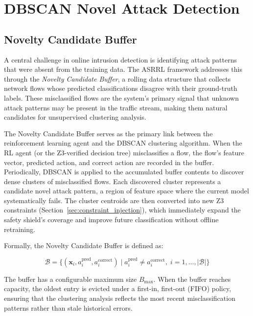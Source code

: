 \documentclass[12pt, letterpaper, oneside]{report}
\newcommand{\ASRRL}{\textsc{ASRRL}}
\newcommand{\bx}{\mathbf{x}}
\begin{document}
\section{DBSCAN Novel Attack Detection}
\label{sec:dbscan}

\subsection{Novelty Candidate Buffer}

A central challenge in online intrusion detection is identifying attack patterns that were absent from the training data. The \ASRRL{} framework addresses this through the \emph{Novelty Candidate Buffer}, a rolling data structure that collects network flows whose predicted classifications disagree with their ground-truth labels. These misclassified flows are the system's primary signal that unknown attack patterns may be present in the traffic stream, making them natural candidates for unsupervised clustering analysis.

The Novelty Candidate Buffer serves as the primary link between the reinforcement learning agent and the DBSCAN clustering algorithm. When the RL agent (or the Z3-verified decision tree) misclassifies a flow, the flow's feature vector, predicted action, and correct action are recorded in the buffer. Periodically, DBSCAN is applied to the accumulated buffer contents to discover dense clusters of misclassified flows. Each discovered cluster represents a candidate novel attack pattern, a region of feature space where the current model systematically fails. The cluster centroids are then converted into new Z3 constraints (Section~\ref{sec:constraint_injection}), which immediately expand the safety shield's coverage and improve future classification without offline retraining.

Formally, the Novelty Candidate Buffer is defined as:

\begin{equation}
\label{eq:buffer}
\mathcal{B} = \{(\bx_i, a_i^{\text{pred}}, a_i^{\text{correct}}) \mid a_i^{\text{pred}} \neq a_i^{\text{correct}}, \; i = 1, \ldots, |\mathcal{B}|\}
\end{equation}

\noindent The buffer has a configurable maximum size $B_{\max}$. When the buffer reaches capacity, the oldest entry is evicted under a first-in, first-out (FIFO) policy, ensuring that the clustering analysis reflects the most recent misclassification patterns rather than stale historical errors.
\end{document}
